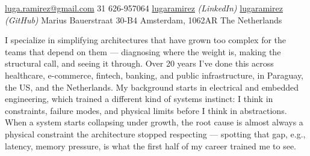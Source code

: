 \documentclass[10pt,a4paper]{article} %
\begin{document}
 



\noindent\href{mailto:luga.ramirez@gmail.com}{luga.ramirez@gmail.com}
\ifdefined\nophone\else\bull \textsmaller{+}31 626-957064\fi
\bull \href{https://www.linkedin.com/in/lugaramirez/}{lugaramirez} \textit{(LinkedIn)}
\bull \href{https://github.com/lugaramirez}{lugaramirez} \textit{(GitHub)}
\bull Marius Bauerstraat 30-B4
\bull Amsterdam, 1062AR
\bull The Netherlands %

\spacedhrule{0.9em}{-0.4em} %



I specialize in simplifying architectures that have grown too complex for the teams that depend on them --- diagnosing where the weight is, making the structural call, and seeing it through. Over 20 years I've done this across healthcare, e-commerce, fintech, banking, and public infrastructure, in Paraguay, the US, and the Netherlands. My background starts in electrical and embedded engineering, which trained a different kind of systems instinct: I think in constraints, failure modes, and physical limits before I think in abstractions. When a system starts collapsing under growth, the root cause is almost always a physical constraint the architecture stopped respecting --- spotting that gap, e.g., latency, memory pressure, is what the first half of my career trained me to see.

\spacedhrule{0.5em}{-0.4em} %


\end{document}
